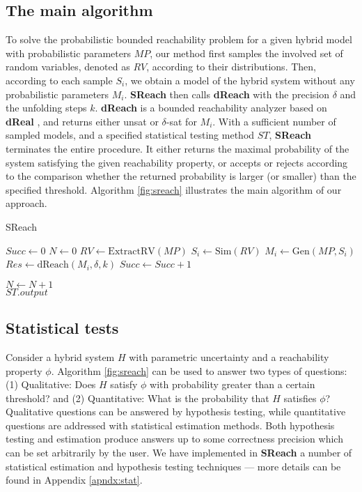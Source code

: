 \subsection{The main algorithm}
To solve the probabilistic bounded reachability problem for a given hybrid model with probabilistic parameters $MP$, our method first samples the involved set of random variables, denoted as $RV$, according to their distributions. Then, according to each sample $S_i$, we obtain a model of the hybrid system without any probabilistic parameters $M_i$. {\bf SReach} then calls {\bf dReach} \cite{gaodelta} with the precision $\delta$ and the unfolding steps $k$. {\bf dReach} is a bounded reachability analyzer based on {\bf dReal} \cite{gao2013dreal}, and returns either unsat or $\delta$-sat for $M_i$. With a sufficient number of sampled models, and a specified statistical testing method $ST$, {\bf SReach} terminates the entire procedure. It either returns the maximal probability of the system satisfying the given reachability property, or accepts or rejects according to the comparison whether the returned probability is larger (or smaller) than the specified threshold. Algorithm \ref{fig:sreach} illustrates the main algorithm of our approach.
\begin{algorithm}
  \centering
  \caption{SReach}
  \label{fig:sreach}
  \begin{algorithmic}[1]
        \State $Succ \gets 0$
        \State $N \gets 0$
        \State $RV \gets \mathrm{ExtractRV}(MP)$
        \Repeat
        	   \State $S_i \gets \mathrm{Sim}(RV)$
            \State $M_i \gets \mathrm{Gen}(MP, S_i)$
            \State $Res \gets \mathrm{dReach}(M_i, \delta, k)$
		\State $Succ \gets Succ + 1$
	    
	  \EndIf
	\State $N \gets N + 1$
        \\
	\quad\hspace{0.5ex} \Return $ST.output$
   \EndFunction
  \end{algorithmic}
\end{algorithm}

\subsection{Statistical tests}
Consider a hybrid system $H$ with parametric uncertainty  and a reachability property $\phi$. Algorithm \ref{fig:sreach} can be used to answer two types of questions: (1) Qualitative: Does $H$ satisfy $\phi$ with probability
greater than a certain threshold? and (2) Quantitative: What is the probability that $H$ satisfies $\phi$?
Qualitative questions can be answered by hypothesis testing, while quantitative questions are addressed with
statistical estimation methods. Both hypothesis testing and estimation produce answers up to some correctness 
precision which can be set arbitrarily by the user.
We have implemented in {\bf SReach} a number of statistical estimation and hypothesis testing techniques ---
more details can be found in Appendix \ref{apndx:stat}.

